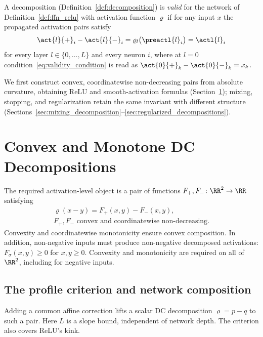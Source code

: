 \begin{definition}\label{def:valid_decomposition}
A decomposition (Definition~\ref{def:decomposition}) is \emph{valid} for the network of Definition~\ref{def:ffn_relu} with activation function $\varrho$ if for any input $x$ the propagated activation pairs satisfy
\begin{equation}
	\act{l}{+}_i - \act{l}{-}_i = \varrho_l\bigl(\preactl{l}_i\bigr) = \actl{l}_i
	\label{eq:validity_condition}
\end{equation}
for every layer $l \in \{0, \dots, L\}$ and every neuron $i$, where at $l = 0$ condition~\eqref{eq:validity_condition} is read as $\act{0}{+}_k - \act{0}{-}_k = x_k$.
\end{definition}

We first construct convex, coordinatewise non-decreasing pairs from absolute curvature, obtaining ReLU and smooth-activation formulas (Section~\ref{sec:dc_decompositions}); mixing, stopping, and regularization retain the same invariant with different structure (Sections~\ref{sec:mixing_decomposition}--\ref{sec:regularized_decompositions}).

\section{Convex and Monotone DC Decompositions}\label{sec:dc_decompositions}

The required activation-level object is a pair of functions $F_+,F_-\colon\RR^2\to\RR$ satisfying
\begin{equation}
    \begin{gathered}
    \varrho(x-y)=F_+(x,y)-F_-(x,y),\\
    F_+,F_-\text{ convex and coordinatewise non-decreasing}.
    \end{gathered}
    \label{eq:general_dc_pair}
\end{equation}
Convexity and coordinatewise monotonicity ensure convex composition. In addition, non-negative inputs must produce non-negative decomposed activations: $F_\sigma(x,y)\ge0$ for $x,y\ge0$. Convexity and monotonicity are required on all of $\RR^2$, including for negative inputs.

\subsection{The profile criterion and network composition}

Adding a common affine correction lifts a scalar DC decomposition $\varrho=p-q$ to such a pair. Here $L$ is a slope bound, independent of network depth. The criterion also covers ReLU's kink.

